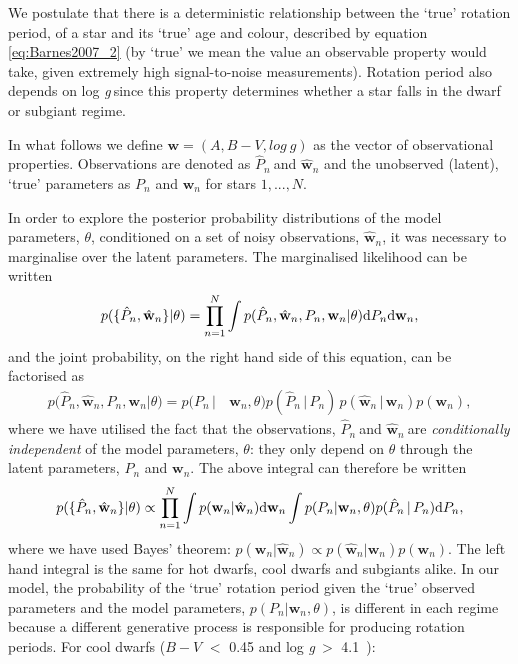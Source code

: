 \documentclass[11pt,preprint]{aastex}
\newcommand{\logg}{log \emph{g}}
\newcommand{\w}{\mathbf{w}}
\newcommand{\wh}{$\hat{\mathbf{w}}_n$}
\newcommand{\ph}{$\hat{P}_n$}
\newcommand{\subcut}{4.1~}
\begin{document}
We postulate that there is a deterministic relationship between the `true'
rotation period, of a star and its `true' age and colour, described by
equation \ref{eq:Barnes2007_2} (by `true' we mean the value an observable property would take, given extremely high signal-to-noise measurements).
Rotation period also depends on \logg$~$since this property determines whether a star falls in the dwarf or subgiant regime.

In what follows we define $\mathbf{w} = (A, B-V, log~g)$ as the vector of observational properties.
Observations are denoted as \ph$~$and $\hat{\mathbf{w}}_n$ and the unobserved (latent), `true' parameters as $P_n$ and $\mathbf{w}_n$ for stars $1,...,N$.

In order to explore the posterior probability distributions of the model parameters, $\theta$, conditioned on a set of noisy observations, \wh, it was necessary to marginalise over the latent parameters.
The marginalised likelihood can be written
\begin{equation}
	p(\{\hat{P}_n,\hat{\w}_n\}|\theta) =
	\prod_{n=1}^{N} \int p(\hat{P}_n,\hat{\w}_n,P_n,\w_n|\theta){\rm d}P_n {\rm d}\w_n,
\label{eq:fulll}
\end{equation}
and the joint probability, on the right hand side of this equation, can be factorised as
\begin{align}
	p(\hat{P}_n,\hat{\w}_n,P_n,\w_n|\theta) = p(P_n\,| & \,\w_n,\theta) p(\hat{P}_n\,|\,P_n)\,p(\hat{\w}_n\,|\,\w_n)p(\w_n),
\nonumber
\end{align}
where we have utilised the fact that the observations, \ph$~$and \wh$~$are {\it conditionally independent} of the model parameters, $\theta$: they only depend on $\theta$ through the latent parameters, $P_n$ and $\w_n$.
The above integral can therefore be written
\begin{equation}
	p(\{\hat{P}_n,\hat{\w}_n\}|\theta) \propto
	\prod_{n=1}^{N} \int p(\w_n|\hat{\w}_n) {\rm d}\w_n \int p(P_n|\w_n,\theta) p(\hat{P}_n\,|\,P_n) {\rm d}P_n,
\label{eq:fac}
\end{equation}
where we have used Bayes' theorem: $p(\w_n|\hat{\w}_n) \propto p(\hat{\w}_n|\w_n)p(\w_n)$.
The left hand integral is the same for hot dwarfs, cool dwarfs and subgiants alike.
In our model, the probability of the `true' rotation period given the `true' observed parameters and the model parameters, $p(P_n|\w_n, \theta)$, is different in each regime because a different generative process is responsible for producing rotation periods.
For cool dwarfs ($B-V$ $<$ 0.45 and \logg$~>$ \subcut):
\end{document}
